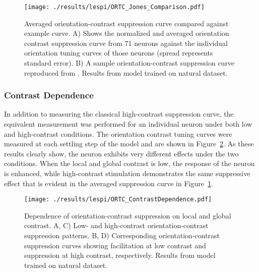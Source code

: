 \begin{figure}
	\centering
        \texttt{[image: ./results/lespi/ORTC\_Jones\_Comparison.pdf]}
	\caption[Averaged orientation-contrast suppression curve compared
      against \cite{Jones2002} example curve.]{Averaged
      orientation-contrast suppression curve compared against
      \cite{Jones2002} example curve. A) Shows the normalized and
      averaged orientation contrast suppression curve from 71 neurons
      against the individual orientation tuning curves of those
      neurons (spread represents standard error). B) A sample
      orientation-contrast suppression curve reproduced from
      \cite{Jones2002}. Results from model trained on natural
      dataset.}
	\label{ORTC_Jones}
\end{figure}

\subsubsection*{Contrast Dependence}

In addition to measuring the classical high-contrast suppression
curve, the equivalent measurement was performed for an individual
neuron under both low and high-contrast conditions. The orientation
contrast tuning curves were measured at each settling step of the
model and are shown in Figure~\ref{ORTC_ContrastDependence}. As these
results clearly show, the neuron exhibits very different effects under
the two conditions. When the local and global contrast is low, the
response of the neuron is enhanced, while high-contrast stimulation
demonstrates the same suppressive effect that is evident in the
averaged suppression curve in Figure~\ref{ORTC_Jones}.

\begin{figure}
	\centering
        \texttt{[image: ./results/lespi/ORTC\_ContrastDependence.pdf]}
	\caption[Dependence of orientation-contrast suppression on local
      and global contrast.]{Dependence of orientation-contrast
      suppression on local and global contrast. A, C) Low- and
      high-contrast orientation-contrast suppression patterns. B, D)
      Corresponding orientation-contrast suppression curves showing
      facilitation at low contrast and suppression at high contrast,
      respectively. Results from model trained on natural dataset.}
	\label{ORTC_ContrastDependence}
\end{figure}

